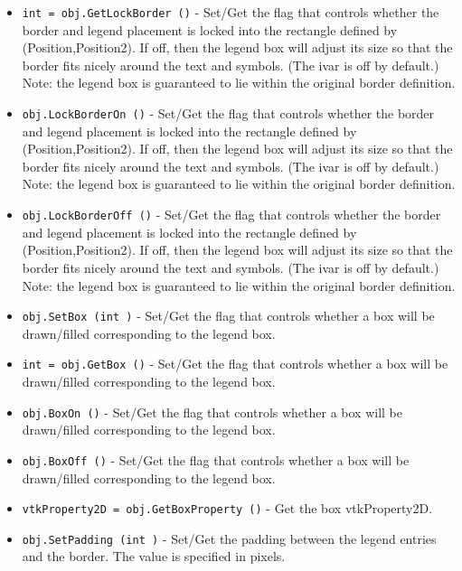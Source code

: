 \begin{itemize}
\item  \verb|int = obj.GetLockBorder ()| -  Set/Get the flag that controls whether the border and legend
 placement is locked into the rectangle defined by (Position,Position2).
 If off, then the legend box will adjust its size so that the border
 fits nicely around the text and symbols. (The ivar is off by default.)
 Note: the legend box is guaranteed to lie within the original border
 definition.

\item  \verb|obj.LockBorderOn ()| -  Set/Get the flag that controls whether the border and legend
 placement is locked into the rectangle defined by (Position,Position2).
 If off, then the legend box will adjust its size so that the border
 fits nicely around the text and symbols. (The ivar is off by default.)
 Note: the legend box is guaranteed to lie within the original border
 definition.

\item  \verb|obj.LockBorderOff ()| -  Set/Get the flag that controls whether the border and legend
 placement is locked into the rectangle defined by (Position,Position2).
 If off, then the legend box will adjust its size so that the border
 fits nicely around the text and symbols. (The ivar is off by default.)
 Note: the legend box is guaranteed to lie within the original border
 definition.

\item  \verb|obj.SetBox (int )| -  Set/Get the flag that controls whether a box will be drawn/filled
 corresponding to the legend box.

\item  \verb|int = obj.GetBox ()| -  Set/Get the flag that controls whether a box will be drawn/filled
 corresponding to the legend box.

\item  \verb|obj.BoxOn ()| -  Set/Get the flag that controls whether a box will be drawn/filled
 corresponding to the legend box.

\item  \verb|obj.BoxOff ()| -  Set/Get the flag that controls whether a box will be drawn/filled
 corresponding to the legend box.

\item  \verb|vtkProperty2D = obj.GetBoxProperty ()| -  Get the box vtkProperty2D.

\item  \verb|obj.SetPadding (int )| -  Set/Get the padding between the legend entries and the border. The value
 is specified in pixels.


\end{itemize}
